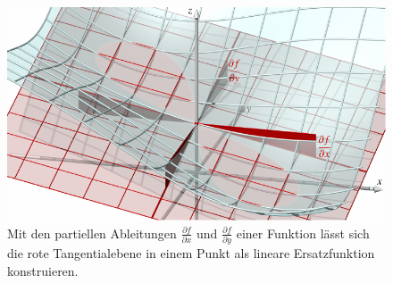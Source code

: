 %
%
%
\begin{figure}
\centering
\includegraphics{chapters/010-fuvar/images/tangential.pdf}
\caption{Mit den partiellen Ableitungen $\frac{\partial f}{\partial x}$
und $\frac{\partial f}{\partial y}$ einer Funktion lässt sich die rote
Tangentialebene in einem Punkt als lineare Ersatzfunktion konstruieren.
\label{buch:fuvar:richtungsableitung:fig:tangentialebene}}
\end{figure}
